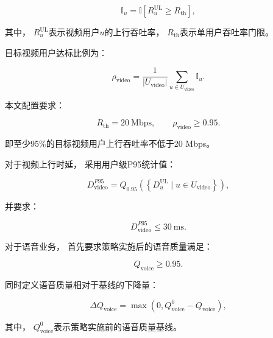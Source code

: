 \documentclass[lang=cn,12pt]{elegantbook}
\begin{document}
\begin{equation}
\mathbb{I}_u
=
\mathbb{I}
\left[
R_u^{\mathrm{UL}}
\geq
R_{\mathrm{th}}
\right],
\label{eq:video_user_threshold_indicator}
\end{equation}

其中，
$R_u^{\mathrm{UL}}$表示视频用户$u$的上行吞吐率，
$R_{\mathrm{th}}$表示单用户吞吐率门限。

目标视频用户达标比例为：

\begin{equation}
\rho_{\mathrm{video}}
=
\frac{1}
{\left|U_{\mathrm{video}}\right|}
\sum_{u\in U_{\mathrm{video}}}
\mathbb{I}_u.
\label{eq:translated_video_satisfaction_ratio}
\end{equation}

本文配置要求：

\begin{equation}
R_{\mathrm{th}}
=
20~\mathrm{Mbps},
\qquad
\rho_{\mathrm{video}}
\geq
0.95.
\label{eq:translated_video_throughput_sla}
\end{equation}

即至少95\%的目标视频用户上行吞吐率不低于20 Mbps。

对于视频上行时延，
采用用户级P95统计值：

\begin{equation}
D_{\mathrm{video}}^{P95}
=
Q_{0.95}
\left(
\left\{
D_u^{\mathrm{UL}}
\mid
u\in U_{\mathrm{video}}
\right\}
\right),
\label{eq:translated_video_delay_p95}
\end{equation}

并要求：

\begin{equation}
D_{\mathrm{video}}^{P95}
\leq
30~\mathrm{ms}.
\label{eq:translated_video_delay_sla}
\end{equation}

对于语音业务，
首先要求策略实施后的语音质量满足：

\begin{equation}
Q_{\mathrm{voice}}
\geq
0.95.
\label{eq:translated_voice_quality_sla}
\end{equation}

同时定义语音质量相对于基线的下降量：

\begin{equation}
\Delta Q_{\mathrm{voice}}
=
\max
\left(
0,
Q_{\mathrm{voice}}^{0}
-
Q_{\mathrm{voice}}
\right),
\label{eq:translated_voice_degradation}
\end{equation}

其中，
$Q_{\mathrm{voice}}^{0}$表示策略实施前的语音质量基线。
\end{document}
